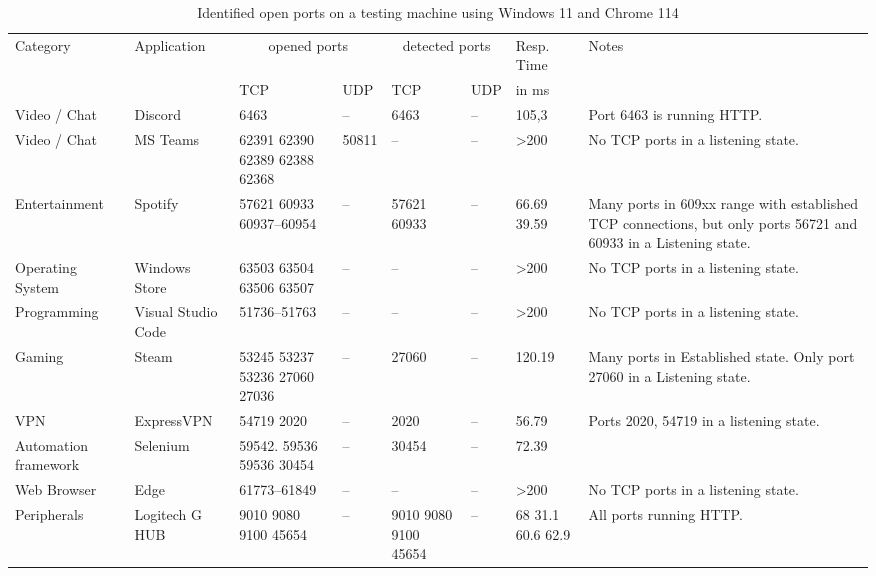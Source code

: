 \begin{table}[htbp]
\footnotesize
\centering
\begin{adjustwidth}{-0.5cm}{}
\begin{tabular}{p{2cm}p{2cm}p{1cm}p{1cm}p{1cm}p{1cm}p{1cm}p{5cm}}
    \toprule
    Category & Application & \multicolumn{2}{c}{opened ports} & \multicolumn{2}{c}{detected ports} & Resp. Time & Notes\\
     \cmidrule{3-4} \cmidrule{5-6} \cmidrule{7-7}
     & & TCP & UDP & TCP & UDP & in ms & \\
     \midrule
     Video / Chat & Discord & 6463 & -- & 6463 & -- & 105,3 & Port 6463 is running HTTP. \\
     Video / Chat & MS Teams & 62391 62390 62389 62388 62368 & 50811 & -- & -- & >200 & No TCP ports in a listening state. \\
     Entertainment & Spotify & 57621 60933 60937--60954 & -- & 57621 60933 & -- & 66.69 39.59 & Many ports in 609xx range with established TCP connections, but only ports 56721 and 60933 in a Listening state. \\ 
     Operating System & Windows Store & 63503 63504 63506 63507 & -- & -- & -- & >200 & No TCP ports in a listening state. \\ 
    Programming & Visual Studio Code & 51736--51763 & -- & -- & -- & >200 & No TCP ports in a listening state. \\ 
    Gaming & Steam & 53245 53237 53236 27060 27036 & -- & 27060 & -- & 120.19 & Many ports in Established state. Only port 27060 in a Listening state. \\ 
    VPN & ExpressVPN & 54719 2020 & -- & 2020 & -- & 56.79 & Ports 2020, 54719 in a listening state. \\ 
    Automation framework & Selenium & 59542. 59536 59536 30454 & -- & 30454 & -- & 72.39 & \\ 
    Web Browser & Edge & 61773--61849 & -- & -- & -- & >200 & No TCP ports in a listening state. \\ 
    Peripherals & Logitech G HUB & 9010 9080 9100 45654 & -- & 9010 9080 9100 45654 & -- & 68 31.1 60.6 62.9 & All ports running HTTP. \\ 
     \bottomrule
\end{tabular}
\end{adjustwidth}{}
\caption{Identified open ports on a testing machine using Windows 11 and Chrome 114}
\label{tab:identifying-applications}
\end{table}
\clearpage

